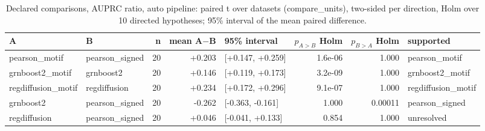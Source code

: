 \begin{table}[H]\centering\small
\caption{Declared comparisons, AUPRC ratio, auto pipeline: paired t over datasets (compare\_units), two-sided per direction, Holm over 10 directed hypotheses; 95\% interval of the mean paired difference.}
\begin{tabular}{llrrlrrl}\toprule
A & B & n & mean A$-$B & 95\% interval & $p_{A>B}$ Holm & $p_{B>A}$ Holm & supported \\ \midrule
pearson\_motif & pearson\_signed & 20 & +0.203 & [+0.147, +0.259] & 1.6e-06 & 1.000 & pearson\_motif \\
grnboost2\_motif & grnboost2 & 20 & +0.146 & [+0.119, +0.173] & 3.2e-09 & 1.000 & grnboost2\_motif \\
regdiffusion\_motif & regdiffusion & 20 & +0.234 & [+0.172, +0.296] & 9.1e-07 & 1.000 & regdiffusion\_motif \\
grnboost2 & pearson\_signed & 20 & -0.262 & [-0.363, -0.161] & 1.000 & 0.00011 & pearson\_signed \\
regdiffusion & pearson\_signed & 20 & +0.046 & [-0.041, +0.133] & 0.854 & 1.000 & unresolved \\
\bottomrule\end{tabular}\end{table}
